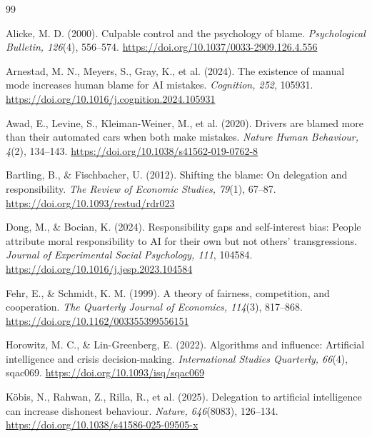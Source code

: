 \documentclass[11pt,a4paper]{article}
\begin{document}
\begingroup
\RaggedRight
\begin{thebibliography}{99}
\RaggedRight
{}

Alicke, M. D. (2000). Culpable control and the psychology of blame. \textit{Psychological Bulletin, 126}(4), 556--574. \url{https://doi.org/10.1037/0033-2909.126.4.556}

Arnestad, M. N., Meyers, S., Gray, K., et al. (2024). The existence of manual mode increases human blame for AI mistakes. \textit{Cognition, 252}, 105931. \url{https://doi.org/10.1016/j.cognition.2024.105931}

Awad, E., Levine, S., Kleiman-Weiner, M., et al. (2020). Drivers are blamed more than their automated cars when both make mistakes. \textit{Nature Human Behaviour, 4}(2), 134--143. \url{https://doi.org/10.1038/s41562-019-0762-8}

Bartling, B., \& Fischbacher, U. (2012). Shifting the blame: On delegation and responsibility. \textit{The Review of Economic Studies, 79}(1), 67--87. \url{https://doi.org/10.1093/restud/rdr023}

Dong, M., \& Bocian, K. (2024). Responsibility gaps and self-interest bias: People attribute moral responsibility to AI for their own but not others' transgressions. \textit{Journal of Experimental Social Psychology, 111}, 104584. \url{https://doi.org/10.1016/j.jesp.2023.104584}

Fehr, E., \& Schmidt, K. M. (1999). A theory of fairness, competition, and cooperation. \textit{The Quarterly Journal of Economics, 114}(3), 817--868. \url{https://doi.org/10.1162/003355399556151}

Horowitz, M. C., \& Lin-Greenberg, E. (2022). Algorithms and influence: Artificial intelligence and crisis decision-making. \textit{International Studies Quarterly, 66}(4), sqac069. \url{https://doi.org/10.1093/isq/sqac069}

K\"{o}bis, N., Rahwan, Z., Rilla, R., et al. (2025). Delegation to artificial intelligence can increase dishonest behaviour. \textit{Nature, 646}(8083), 126--134. \url{https://doi.org/10.1038/s41586-025-09505-x}


\end{thebibliography}
\end{document}
